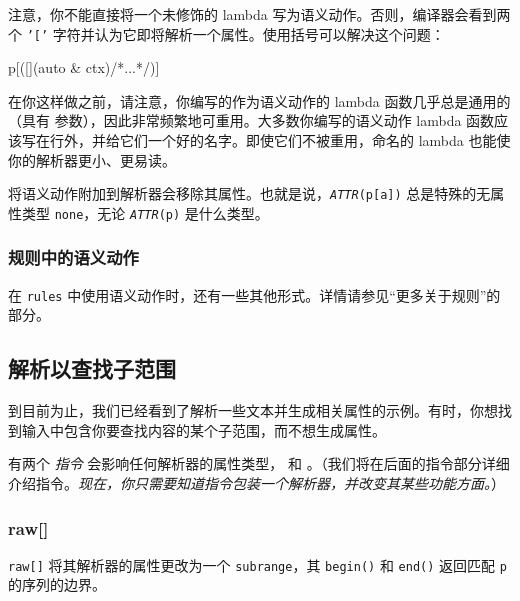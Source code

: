 注意，你不能直接将一个未修饰的 lambda 写为语义动作。否则，编译器会看到两个 \texttt{'{[}'} 字符并认为它即将解析一个属性。使用括号可以解决这个问题：

\begin{code}
p[([](auto & ctx){/*...*/})]
\end{code}

在你这样做之前，请注意，你编写的作为语义动作的 lambda 函数几乎总是通用的（具有  参数），因此非常频繁地可重用。大多数你编写的语义动作 lambda 函数应该写在行外，并给它们一个好的名字。即使它们不被重用，命名的 lambda 也能使你的解析器更小、更易读。

\begin{marker}
将语义动作附加到解析器会移除其属性。也就是说，\emph{\texttt{ATTR}}\texttt{(p{[}a{]})} 总是特殊的无属性类型 \texttt{none}，无论 \emph{\texttt{ATTR}}\texttt{(p)} 是什么类型。
\end{marker}

\subsubsection{规则中的语义动作}

在 \texttt{rules} 中使用语义动作时，还有一些其他形式。详情请参见“更多关于规则”的部分。

\subsection{解析以查找子范围}

到目前为止，我们已经看到了解析一些文本并生成相关属性的示例。有时，你想找到输入中包含你要查找内容的某个子范围，而不想生成属性。

有两个 \emph{指令} 会影响任何解析器的属性类型， 和 。（我们将在后面的指令部分详细介绍指令。\emph{现在，你只需要知道指令包装一个解析器，并改变其某些功能方面。}）

\subsubsection{raw{[}{]}}

\texttt{raw{[}{]}} 将其解析器的属性更改为一个 \texttt{subrange}，其 \texttt{begin()} 和 \texttt{end()} 返回匹配 \texttt{p} 的序列的边界。

